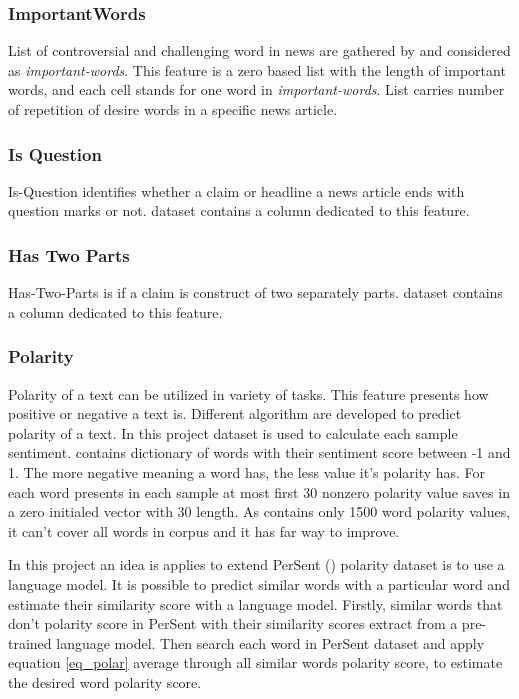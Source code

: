 \subsubsection{ImportantWords}
List of controversial and challenging word in news are gathered by \cite{stance_persian} and considered as \textit{important-words}. This feature is a zero based list with the length of important words, and each cell stands for one word in \textit{important-words}. List carries number of repetition of desire words in a specific news article.
\subsubsection{Is Question}
Is-Question identifies whether a claim or headline a news article ends with question marks or not. \cite{stance_persian} dataset contains a column dedicated to this feature.
\subsubsection{Has Two Parts}
Has-Two-Parts is if a claim is construct of two separately parts. \cite{stance_persian} dataset contains a column dedicated to this feature.
\subsubsection{Polarity}  
Polarity of a text can be utilized in variety of tasks. This feature presents how positive or negative a text is. Different algorithm are developed to predict polarity of a text. In this project \cite{persent} dataset is used to calculate each sample sentiment. \cite{persent} contains dictionary of words with their sentiment score between -1 and 1. The more negative meaning a word has, the less value it's polarity has. For each word presents in each sample at most first 30 nonzero polarity value saves in a zero initialed vector with 30 length. As \cite{persent} contains only 1500 word polarity values, it can't cover all words in corpus and it has far way to improve. 

In this project an idea is applies to extend PerSent (\cite{persent}) polarity dataset is to use a language model. It is possible to predict similar words with a particular word and estimate their similarity score with a language model. Firstly, similar words that don't polarity score in PerSent with their similarity scores extract from a pre-trained language model. Then search each word in PerSent dataset and apply equation \ref{eq_polar} average through all similar words polarity score, to estimate the desired word polarity score.

